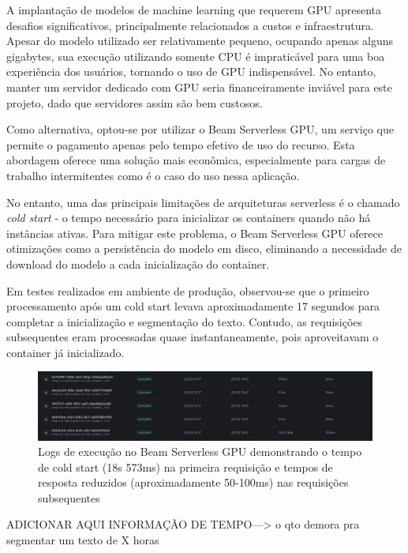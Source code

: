 \documentclass[tcc,capa]{texufpel}
\begin{document}
A implantação de modelos de machine learning que requerem GPU apresenta desafios significativos, principalmente relacionados a custos e infraestrutura. Apesar do modelo utilizado ser relativamente pequeno, ocupando apenas alguns gigabytes, sua execução utilizando somente CPU é impraticável para uma boa experiência dos usuários, tornando o uso de GPU indispensável. No entanto, manter um servidor dedicado com GPU seria financeiramente inviável para este projeto, dado que servidores assim são bem custosos.

Como alternativa, optou-se por utilizar o Beam Serverless GPU, um serviço que permite o pagamento apenas pelo tempo efetivo de uso do recurso. Esta abordagem oferece uma solução mais econômica, especialmente para cargas de trabalho intermitentes como é o caso do uso nessa aplicação.

No entanto, uma das principais limitações de arquiteturas serverless é o chamado \textit{cold start} - o tempo necessário para inicializar os containers quando não há instâncias ativas. Para mitigar este problema, o Beam Serverless GPU oferece otimizações como a persistência do modelo em disco, eliminando a necessidade de download do modelo a cada inicialização do container.

Em testes realizados em ambiente de produção, observou-se que o primeiro processamento após um cold start levava aproximadamente 17 segundos para completar a inicialização e segmentação do texto. Contudo, as requisições subsequentes eram processadas quase instantaneamente, pois aproveitavam o container já inicializado.


\begin{figure}[H]
  \centering
  \includegraphics[width=\textwidth,height=0.45\textheight,keepaspectratio]{exemplo-slides/graphics/images/logs-beam.png}
  \caption{Logs de execução no Beam Serverless GPU demonstrando o tempo de cold start (18s 573ms) na primeira requisição e tempos de resposta reduzidos (aproximadamente 50-100ms) nas requisições subsequentes}
  \label{fig:Average_encryption_throughput}
\end{figure}



ADICIONAR AQUI INFORMAÇÃO DE TEMPO---> o qto demora pra segmentar um texto de X horas
\end{document}

